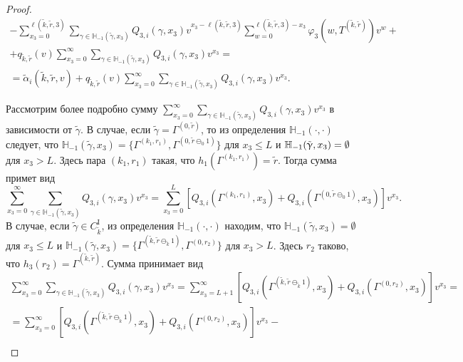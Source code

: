 \begin{proof}
\begin{multline}
-\sum_{x_3=0}^{\ell(\tilde{k}, \tilde{r}, 3)}  \sum_{\gamma \in {\mathbb H}_{-1}(\tilde{\gamma}, x_3)} Q_{3, i}(\gamma, x_3) v^{x_3-\ell(\tilde{k}, \tilde{r}, 3)}   \sum_{w=0}^{\ell(\tilde{k}, \tilde{r}, 3) -x_3}
\varphi_3(w, T^{(\tilde{k}, \tilde{r})}) v^w   +\\
+ q_{\tilde{k}, \tilde{r}}(v) \sum_{x_3=0}^{\infty} \sum_{\gamma \in {\mathbb H}_{-1}(\tilde{\gamma}, x_3)} Q_{3, i}(\gamma, x_3) v^{x_3} =\\
=\tilde{\alpha}_i(\tilde{k}, \tilde{r}, v) + q_{\tilde{k}, \tilde{r}}(v) \sum_{x_3=0}^{\infty} \sum_{\gamma \in {\mathbb H}_{-1}(\tilde{\gamma}, x_3)} Q_{3, i}(\gamma, x_3) v^{x_3}.
\label{rekur:general:second}
\end{multline}

Рассмотрим более подробно сумму $\sum_{x_3=0}^{\infty} \sum_{\gamma \in {\mathbb H}_{-1}(\tilde{\gamma}, x_3)} Q_{3, i}(\gamma, x_3) v^{x_3}$ в зависимости от $\tilde{\gamma}$.
В случае,  если $\tilde{\gamma} = \Gamma^{(0, \tilde{r})}$,  то из определения ${\mathbb H}_{-1}(\cdot, \cdot)$ следует,  что ${\mathbb H}_{-1}(\tilde{\gamma}, x_3) = \{\Gamma^{(k_1, r_1)},  \Gamma^{(0, \tilde{r}\ominus_0 1)}\}$ для $x_3 \leqslant L$ и
${\mathbb H}_{-1}(\tilde{\gamma}, x_3) \hm=\emptyset$ для $x_3 > L$. Здесь пара $(k_1, r_1)$ такая,  что $h_1(\Gamma^{(k_1, r_1)}) = \tilde{r}$. Тогда сумма примет вид
\begin{equation}
\sum_{x_3=0}^{\infty} \sum_{\gamma \in {\mathbb H}_{-1}(\tilde{\gamma}, x_3)} Q_{3, i}(\gamma, x_3) v^{x_3} = \sum_{x_3=0}^{L} \left[ Q_{3, i}(\Gamma^{(k_1, r_1)}, x_3) + Q_{3, i}(\Gamma^{(0, \tilde{r}\ominus_0 1)}, x_3) \right] v^{x_3}.
\label{rekur:additional:first}
\end{equation}
В случае,  если $\tilde{\gamma} \in C_{\tilde{k}}^{\mathrm{I}}$,  из определения  ${\mathbb H}_{-1}(\cdot, \cdot)$ находим,  что ${\mathbb H}_{-1}(\tilde{\gamma}, x_3) = \emptyset$ для $x_3 \leqslant L$ и ${\mathbb H}_{-1}(\tilde{\gamma}, x_3) = \{\Gamma^{(\tilde{k}, \tilde{r}\ominus_{\tilde{k}} 1)},  \Gamma^{(0, r_2)}\}$ для $x_3 > L$. Здесь $r_2$ таково,  что $h_3(r_2)=\Gamma^{(\tilde{k}, \tilde{r})}$. Сумма принимает вид
\begin{multline}
\sum_{x_3=0}^{\infty} \sum_{\gamma \in {\mathbb H}_{-1}(\tilde{\gamma}, x_3)} Q_{3, i}(\gamma, x_3) v^{x_3} = \sum_{x_3=L+1}^{\infty} \left[ Q_{3, i}(\Gamma^{(\tilde{k}, \tilde{r}\ominus_{\tilde{k}} 1)}, x_3) + Q_{3, i}(\Gamma^{(0, r_2)}, x_3) \right] v^{x_3} = \\=
\sum_{x_3=0}^{\infty} \left[ Q_{3, i}(\Gamma^{(\tilde{k}, \tilde{r}\ominus_{\tilde{k}} 1)}, x_3) + Q_{3, i}(\Gamma^{(0, r_2)}, x_3) \right] v^{x_3} -\\

\end{multline}
\end{proof}
